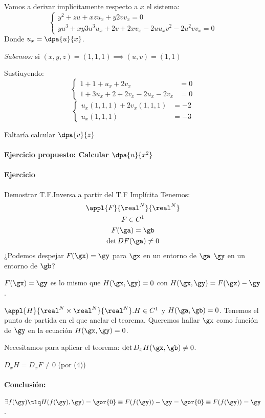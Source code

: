 \documentclass{apuntes}
\begin{document}
Vamos a derivar implícitamente respecto a $x$ el sistema:
\[\left\{\begin{matrix} y^2+zu+xzu_x + y 2v v_x = 0 \\ yu^3+xy3u^3u_x  + 2v + 2xv_x - 2uu_xv^2-2u^2vv_x = 0 \end{matrix}\right.\]
Donde $u_x = \dpa{u}{x}$.

\emph{Sabemos:} si $(x,y,z) = (1,1,1) \implies (u,v) = (1,1)$

Sustiuyendo:
\[\left\{\begin{matrix}1+1+u_x+2v_x &= 0 \\ 1+3u_x+2+2v_x-2u_x-2v_x &= 0\end{matrix}\right.\]
\[\left\{\begin{matrix}u_x(1,1,1) + 2v_x(1,1,1) &= -2\\ u_x(1,1,1) &= -3 \end{matrix}\right.\]

Faltaría  calcular $\dpa{v}{z}$

\paragraph{Ejercicio propuesto: Calcular $\dpa{u}{x^2}$}

\paragraph{Ejercicio} Demostrar T.F.Inversa a partir del T.F Implícita
Tenemos:
\begin{gather}
 \appl{F}{\real^N}{\real^N}\\
 F\in C^1\\
 F(\ga) = \gb\\
 \det DF(\ga) \neq 0
\end{gather}
¿Podemos despejar $F(\gx) = \gy$ para $\gx$ en un entorno de $\ga$ $\gy$ en un entorno de $\gb$?

$F(\gx) = \gy$ es lo mismo que $H(\gx,\gy) = 0$ con $H(\gx,\gy) = F(\gx)-\gy$.

$\appl{H}{\real^N\times \real^N}{\real^N}. H\in C^1$ y $H(\ga,\gb) = 0$. Tenemos el punto de partida en el que anclar el teorema. Queremos hallar $\gx$ como función de $\gy$ en la ecuación $H(\gx,\gy) = 0$.

Necesitamos para aplicar el teorema: $\det D_x H(\gx,\gb) \neq 0$.

\obs $D_x H  = D_x F \neq 0$ (por (4))

\paragraph{Conclusión:} $\exists f(\gy) \tlq H(f(\gy),\gy) = \gor{0} \equiv F(f(\gy)) - \gy = \gor{0} \equiv F(f(\gy)) = \gy$.
\end{document}
